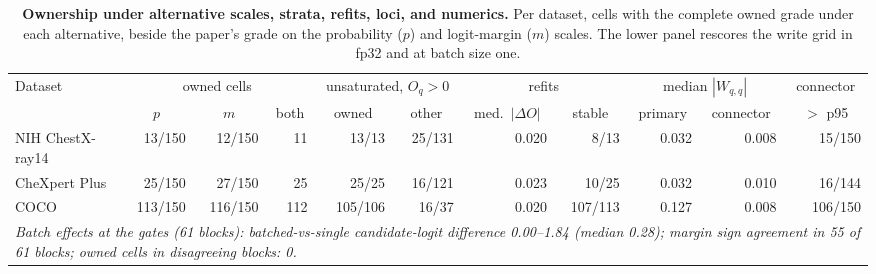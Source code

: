 \documentclass{article}
\begin{document}
\begin{table}[h]
\centering
\scriptsize
\setlength{\tabcolsep}{4pt}
\caption{\textbf{Ownership under alternative scales, strata, refits, loci, and numerics.} Per dataset, cells with the complete owned grade under each alternative, beside the paper's grade on the probability ($p$) and logit-margin ($m$) scales. The lower panel rescores the write grid in fp32 and at batch size one.}
\label{tab:cf-scale}
\begin{tabular}{lrrrrrrrrrr}
\toprule
\multirow{2}{*}{Dataset} & \multicolumn{3}{c}{owned cells} & \multicolumn{2}{c}{unsaturated, $O_q>0$} & \multicolumn{2}{c}{refits} & \multicolumn{2}{c}{median $|W_{q,q}|$} & \multicolumn{1}{c}{connector}\\
\cmidrule(lr){2-4}\cmidrule(lr){5-6}\cmidrule(lr){7-8}\cmidrule(lr){9-10}
& \multicolumn{1}{c}{$p$} & \multicolumn{1}{c}{$m$} & \multicolumn{1}{c}{both} & \multicolumn{1}{c}{owned} & \multicolumn{1}{c}{other} & \multicolumn{1}{c}{med.\ $|\Delta O|$} & \multicolumn{1}{c}{stable} & \multicolumn{1}{c}{primary} & \multicolumn{1}{c}{connector} & \multicolumn{1}{c}{$>$ p95}\\
\midrule
NIH ChestX-ray14 & 13/150 & 12/150 & 11 & 13/13 & 25/131 & 0.020 & 8/13 & 0.032 & 0.008 & 15/150 \\
CheXpert Plus & 25/150 & 27/150 & 25 & 25/25 & 16/121 & 0.023 & 10/25 & 0.032 & 0.010 & 16/144 \\
COCO & 113/150 & 116/150 & 112 & 105/106 & 16/37 & 0.020 & 107/113 & 0.127 & 0.008 & 106/150 \\
\midrule
\multicolumn{11}{p{0.9\linewidth}}{\textit{Batch effects at the gates (61 blocks): batched-vs-single candidate-logit difference 0.00--1.84 (median 0.28); margin sign agreement in 55 of 61 blocks; owned cells in disagreeing blocks: 0.}} \\
\bottomrule
\end{tabular}


\end{table}
\end{document}
